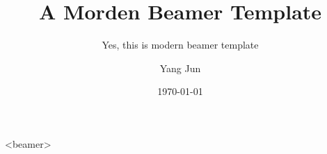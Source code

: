 \title{A Morden Beamer Template}
\subtitle{Yes, this is modern beamer template}
\author[harttle]{Yang Jun}
\date{\today}

\begin{frame}[plain]
  \titlepage
\end{frame}


\begin{frame}<beamer>{\contentsname}
    \tableofcontents
\end{frame}

